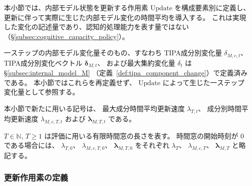 本小節では、内部モデル状態を更新する作用素
$\mathrm{Update}$ を構成要素別に定義し、
更新に伴って実際に生じた内部モデル変化の時間平均を導入する。
これは実現した変化の記述量であり、認知的処理能力を表す量ではない
（\S\ref{subsec:cognitive_capacity_policy}）。

一ステップの内部モデル変化量そのもの、すなわち
TIPA成分別変化量 $\delta_{M,c,t}$、
TIPA成分別変化ベクトル $\boldsymbol{\delta}_{M,t}$、
および最大集約変化量 $\delta_t$ は
\S\ref{subsec:internal_model_M}
（定義~\ref{def:tipa_component_change}）で定義済みである。
本小節ではこれらを再定義せず、
$\mathrm{Update}$ によって生じた一ステップ変化量として参照する。

本小節で新たに用いる記号は、
最大成分時間平均更新速度 $\lambda_{T,t}$、
成分別時間平均更新速度 $\lambda_{M,c,T,t}$ および
$\boldsymbol{\lambda}_{M,T,t}$ である。

$T\in\mathbb{N}$, $T\ge1$ は評価に用いる有限時間窓の長さを表す。
時間窓の開始時刻が $0$ である場合には、
$\lambda_{T,0}$、
$\lambda_{M,c,T,0}$、
$\boldsymbol{\lambda}_{M,T,0}$ をそれぞれ
$\lambda_T$、
$\lambda_{M,c,T}$、
$\boldsymbol{\lambda}_{M,T}$ と略記する。

\subsubsection{更新作用素の定義}

